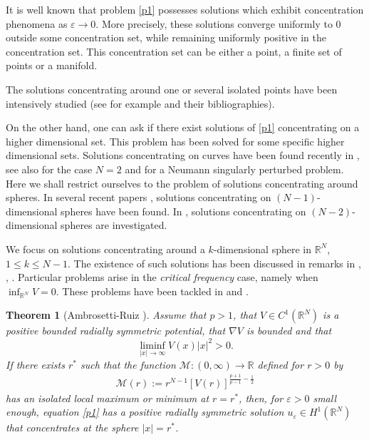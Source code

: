 \documentclass[a4paper]{amsart}
\newtheorem{theorem}{Theorem}
\begin{document}
It is well known that problem \eqref{p1} possesses solutions which exhibit concentration phenomena as $\varepsilon
\rightarrow 0$. More precisely, these solutions converge uniformly to $0$ outside some concentration set, while
remaining uniformly positive in the concentration set. This concentration set can be either a point, a finite set of
points or a manifold. 

The solutions concentrating around one or several isolated points have been intensively studied (see for example
\cites{AM,BVS} and their bibliographies). 

On the other hand, one can ask if there exist solutions of \eqref{p1} concentrating on a higher dimensional set. This problem has been solved for some specific higher dimensional sets. Solutions concentrating on curves have been found recently in \cite{MMM},
see also \cite{DKW} for the case $N=2$ and  for a Neumann singularly perturbed problem. Here we shall
restrict ourselves to the problem of solutions concentrating around spheres. In several recent papers
, solutions concentrating on $(N-1)$-dimensional spheres have been found. In \cite{MP},
solutions concentrating on $(N-2)$-dimensional spheres are investigated. 

We focus on solutions
concentrating around a $k$-dimensional sphere in ${\mathbb{R}}^N$, $1 \leq k \leq N-1$. The existence of such solutions has been
discussed in remarks in \cite{AM2}, \cite{AM}, \cite{ByW}.
Particular problems arise in the \textit{critical frequency} case, namely when $\inf_{{\mathbb{R}}^N} V = 0$. These problems have been
tackled in \cite{AR} and \cite{ByW}.

\begin{theorem}[Ambrosetti-Ruiz \cite{AR}]\label{ThAR}
Assume that $p > 1$, that $V \in C^1({\mathbb{R}}^N)$ is a positive bounded radially symmetric potential, that $\nabla V$ is bounded and that 
\[
 \liminf_{{\left| {x} \right|} \to \infty} V(x){\left| {x} \right|}^2 > 0.
\]
If there exists $r^*$ such that the function $\mathcal{M} : (0, \infty) \to {\mathbb{R}}$ defined for $r > 0$ by
\begin{align}\label{def:Mr}
 \mathcal{M}(r) := r^{N-1} \left[V(r)\right]^{\frac{p+1}{p-1}-\frac{1}{2}}
\end{align}
has an isolated local maximum or minimum at $r = r^*$, then, for $\varepsilon > 0$ small enough, equation \eqref{p1} has a
positive radially symmetric solution $u_{\varepsilon} \in H^1({\mathbb{R}}^N)$ that concentrates at the sphere ${\left| {x} \right|} = r^*$.
\end{theorem}
\end{document}
